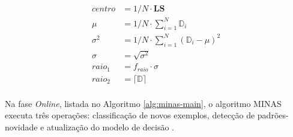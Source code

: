 \begin{definition}
  \begin{align}
    centro    &= 1/N \cdot \mathbf{LS} \label{eq:centro}\\
    \mu       &= 1/N \cdot \sum_{i=1}^{N} \mathbb{D}_i \nonumber \\
    \sigma^2  &= 1/N \cdot \sum_{i=1}^{N} (\mathbb{D}_i - \mu) ^2 \nonumber \\
    \sigma    &= \sqrt{ \sigma^2 } \nonumber \\
    raio_1    &= f_{raio} \cdot \sigma \label{eq:raio_paper}\\
    raio_2    &= \lceil \mathbb{D} \rceil \label{eq:raio_max}\\
  \end{align}
\end{definition}





Na fase \emph{Online}, listada no Algoritmo \ref{alg:minas-main}, o algoritmo
MINAS executa três operações: classificação de novos exemplos, detecção de
padrões-novidade e atualização do modelo de decisão \cite{Faria2016minas}.

